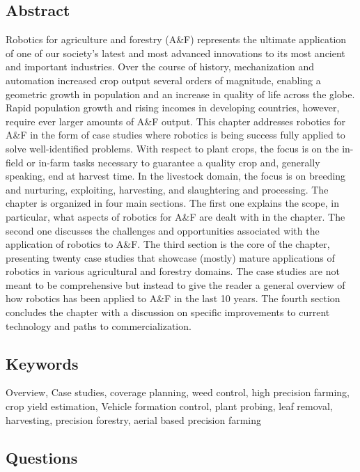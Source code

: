 \documentclass{article}
\begin{document}
\subsection*{Abstract}
Robotics for agriculture and forestry (A\&F) represents the ultimate application of one of our
society’s latest and most advanced innovations to its most ancient and important industries.
Over the course of history, mechanization and automation increased crop output several orders of
magnitude, enabling a geometric growth in population and an increase in quality of life across
the globe. Rapid population growth and rising incomes in developing countries, however, 
require ever larger amounts of A\&F output. This chapter addresses robotics for A\&F in the form
of case studies where robotics is being success fully applied to solve well-identified problems.
With respect to plant crops, the focus is on the in-field or in-farm tasks necessary to guarantee
a quality crop and, generally speaking, end at harvest time. In the livestock domain, the focus
is on breeding and nurturing, exploiting, harvesting, and slaughtering and processing. The chapter
is organized in four main sections. The first one explains the scope, in particular, what aspects
of robotics for A\&F are dealt with in the chapter. The second one discusses the challenges and
opportunities associated with the application of robotics to A\&F. The third section is the core of
the chapter, presenting twenty case studies that showcase (mostly) mature applications of robotics
in various agricultural and forestry domains. The case studies are not meant to be comprehensive 
but instead to give the reader a general overview of how robotics has been applied to
A\&F in the last 10 years. The fourth section concludes the chapter with a discussion on specific
improvements to current technology and paths to commercialization. 



\subsection*{Keywords} Overview, Case studies, coverage planning, weed control, high precision farming, crop yield estimation,
Vehicle formation control, plant probing, leaf removal, harvesting, precision forestry, aerial based precision farming

\subsection*{Questions}
\end{document}
